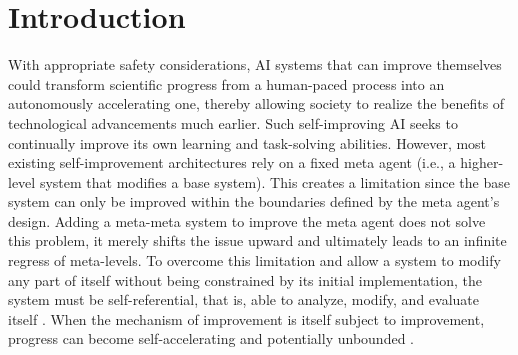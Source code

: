 \documentclass[]{fairmeta}
\title{{\ha}}
\author[1,2\dagger]{Jenny Zhang}
\author[3\dagger]{Bingchen Zhao}
\author[4,6]{Wannan Yang}
\author[6]{Jakob Foerster}
\author[\ddagger]{Minqi Jiang}
\author[7]{Sam Devlin}
\author[6]{Tatiana Shavrina}
\affiliation[1]{University of British Columbia}
\affiliation[2]{Vector Institute}
\affiliation[3]{University of Edinburgh}
\affiliation[5]{Canada CIFAR AI Chair}
\affiliation[6]{FAIR at Meta}
\affiliation[7]{Meta Superintelligence Labs}
\date{\today}
\begin{document}
\maketitle

\section{Introduction}
\label{sec:intro}

With appropriate safety considerations, AI systems that can improve themselves could transform scientific progress from a human-paced process into an autonomously accelerating one, thereby allowing society to realize the benefits of technological advancements much earlier. Such self-improving AI seeks to continually improve its own learning and task-solving abilities. However, most existing self-improvement architectures rely on a fixed meta agent (i.e., a higher-level system that modifies a base system). This creates a limitation since the base system can only be improved within the boundaries defined by the meta agent's design. Adding a meta-meta system to improve the meta agent does not solve this problem, it merely shifts the issue upward and ultimately leads to an infinite regress of meta-levels. To overcome this limitation and allow a system to modify any part of itself without being constrained by its initial implementation, the system must be self-referential, that is, able to analyze, modify, and evaluate itself \citep{kirsch2022eliminating, zhang2025darwin}. When the mechanism of improvement is itself subject to improvement, progress can become self-accelerating and potentially unbounded \citep{lu2023arbitrary}.
\end{document}
